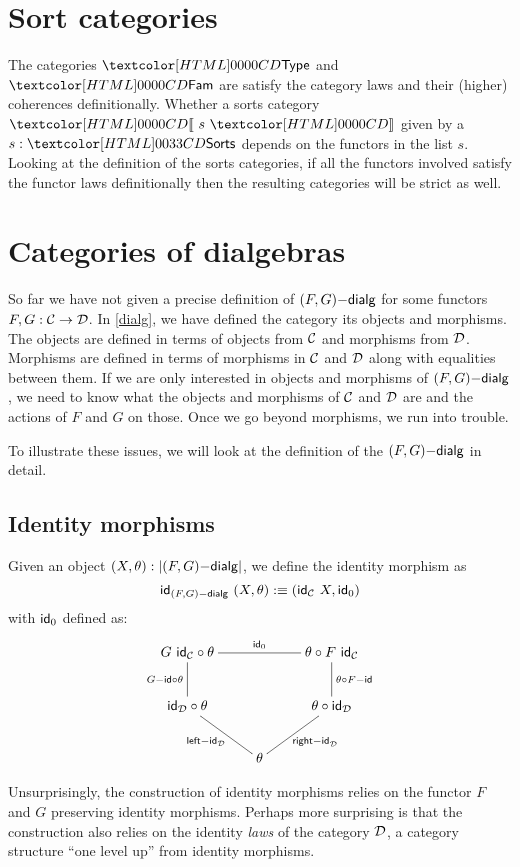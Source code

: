 \section{Sort categories}

The categories $\Type$ and $\Fam$ are satisfy the category laws and
their (higher) coherences definitionally. Whether a sorts category
$\SortCat{s}$ given by a $s : \sortsty$ depends on the functors in the
list $s$. Looking at the definition of the sorts categories, if all
the functors involved satisfy the functor laws definitionally then the
resulting categories will be strict as well.

\section{Categories of dialgebras}

So far we have not given a precise definition of $(F,G)\mathsf{-dialg}$ for
some functors $F, G : \mathcal{C} \to \mathcal{D}$. In \cref{dialg}, we have defined
the category its objects and morphisms. The objects are defined in
terms of objects from $\mathcal{C}$ and morphisms from $\mathcal{D}$. Morphisms are
defined in terms of morphisms in $\mathcal{C}$ and $\mathcal{D}$ along with equalities
between them. If we are only interested in objects and morphisms of
$(F,G)\mathsf{-dialg}$, we need to know what the objects and morphisms of
$\mathcal{C}$ and $\mathcal{D}$ are and the actions of $F$ and $G$ on those. Once we
go beyond morphisms, we run into trouble.

To illustrate these issues, we will look at the definition of the
$(F,G)\mathsf{-dialg}$ in detail. 

\subsection{Identity morphisms}

Given an object $(X,\theta) : | (F,G)\mathsf{-dialg} |$, we define the
identity morphism as
$$
\mathsf{id}_{(F,G)\mathsf{-dialg}}\ (X,\theta) :\equiv (\mathsf{id}_{\mathcal{C}}\ X , \mathsf{id}_0)
$$
with $\mathsf{id}_0$ defined as:
$$
\xymatrix{
G\ \id_\Cc \circ \theta
\ar@{-}[rr]^{\id_0}
\ar@{-}[d]_{\Gid \circ \theta}
&
&\theta \circ F\ \id_\Cc
\ar@{-}[d]^{\theta \circ \Fid}
\\
\id_\Dd \circ \theta
\ar@{-}[dr]_{\leftid_{\Dd}}
&
&\theta \circ \id_\Dd
\ar@{-}[dl]^{\rightid_{\Dd}}
\\
&\theta
&
}
$$

Unsurprisingly, the construction of identity morphisms relies on the
functor $F$ and $G$ preserving identity morphisms. Perhaps more
surprising is that the construction also relies on the identity
\emph{laws} of the category $\mathcal{D}$, \ie a category structure ``one
level up'' from identity morphisms.

